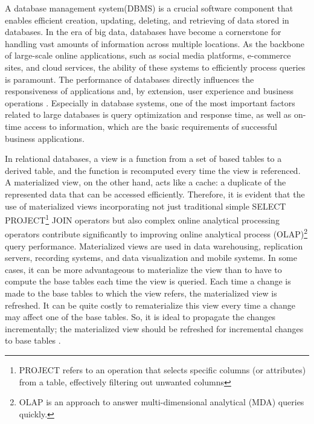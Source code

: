 A database management system(DBMS) is a crucial software component that enables efficient creation, updating, deleting, and retrieving of data stored in databases. In the era of big data, databases have become a cornerstone for handling vast amounts of information across multiple locations. As the backbone of large-scale online applications, such as social media platforms, e-commerce sites, and cloud services, the ability of these systems to efficiently process queries is paramount. The performance of databases directly influences the responsiveness of applications and, by extension, user experience and business operations \cite{4}. Especially in database systems, one of the most important factors related to large databases is query optimization and response time, as well as on-time access to information, which are the basic requirements of successful business applications.\vspace{.4cm}

In relational databases, a view is a function from a set of based tables to a derived table, and the function is recomputed every time the view is referenced. A materialized view, on the other hand, acts like a cache: a duplicate of the represented data that can be accessed efficiently. Therefore, it is evident that the use of materialized views incorporating not just traditional simple SELECT PROJECT\footnote{PROJECT refers to an operation that selects specific columns (or attributes) from a table, effectively filtering out unwanted columns} JOIN operators but also complex online analytical processing operators contribute significantly to improving online analytical process (OLAP)\footnote{OLAP is an approach to answer multi-dimensional analytical (MDA) queries quickly.} query performance. Materialized views are used in data warehousing, replication servers, recording systems, and data visualization and mobile systems. In some cases, it can be more advantageous to materialize the view than to have to compute the base tables each time the view is queried. Each time a change is made to the base tables to which the view refers, the materialized view is refreshed. It can be quite costly to rematerialize this view every time a change may affect one of the base tables. So, it is ideal to propagate the changes incrementally; the materialized view should be refreshed for incremental changes to base tables \cite{Data_warehousing,efficient_incremental,rashid2009role}.\vspace{.4cm}

